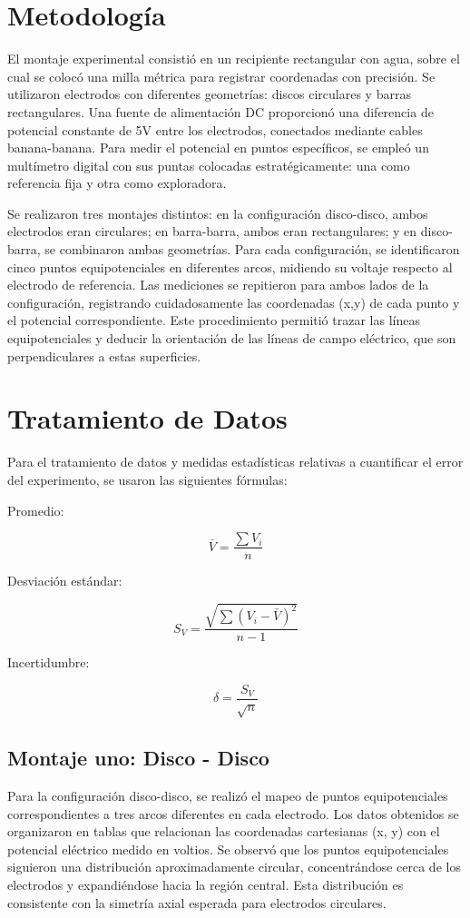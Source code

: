 \documentclass[11pt,twocolumn]{article}
\begin{document}
\section{Metodología}
El montaje experimental consistió en un recipiente rectangular con agua, sobre el cual se colocó una milla métrica para registrar coordenadas con precisión. Se utilizaron electrodos con diferentes geometrías: discos circulares y barras rectangulares. Una fuente de alimentación DC proporcionó una diferencia de potencial constante de 5V entre los electrodos, conectados mediante cables banana-banana. Para medir el potencial en puntos específicos, se empleó un multímetro digital con sus puntas colocadas estratégicamente: una como referencia fija y otra como exploradora.

Se realizaron tres montajes distintos: en la configuración disco-disco, ambos electrodos eran circulares; en barra-barra, ambos eran rectangulares; y en disco-barra, se combinaron ambas geometrías. Para cada configuración, se identificaron cinco puntos equipotenciales en diferentes arcos, midiendo su voltaje respecto al electrodo de referencia. Las mediciones se repitieron para ambos lados de la configuración, registrando cuidadosamente las coordenadas (x,y) de cada punto y el potencial correspondiente. Este procedimiento permitió trazar las líneas equipotenciales y deducir la orientación de las líneas de campo eléctrico, que son perpendiculares a estas superficies.

\section{Tratamiento de Datos}

Para el tratamiento de datos y medidas estadísticas relativas a cuantificar el error del experimento, se usaron las siguientes fórmulas:

Promedio:

\[\bar{V} = \frac{\sum V_i}{n}\]

Desviación estándar:

\[S_V = \frac{\sqrt{\sum (V_i - \bar{V})^2}}{n-1}\]

Incertidumbre:

\[\delta = \frac{S_V}{\sqrt{n}}\]

\subsection{Montaje uno: Disco - Disco}
Para la configuración disco-disco, se realizó el mapeo de puntos equipotenciales correspondientes a tres arcos diferentes en cada electrodo. Los datos obtenidos se organizaron en tablas que relacionan las coordenadas cartesianas (x, y) con el potencial eléctrico medido en voltios. Se observó que los puntos equipotenciales siguieron una distribución aproximadamente circular, concentrándose cerca de los electrodos y expandiéndose hacia la región central. Esta distribución es consistente con la simetría axial esperada para electrodos circulares.
\end{document}
